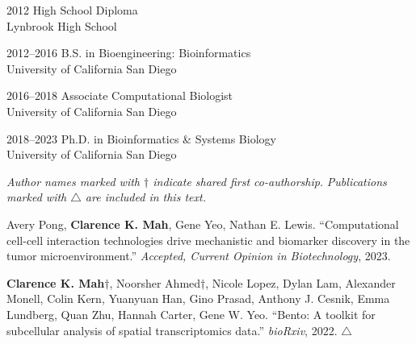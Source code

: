 \documentclass[11pt]{formatting-template}
\begin{document}
\begin{vita}
\noindent
\begin{cv}{}
\begin{cvlist}{}
	\item[2012] High School Diploma\\
		Lynbrook High School
	\item[2012--2016] B.S. in Bioengineering: Bioinformatics\\
		University of California San Diego
	\item[2016--2018] Associate Computational Biologist\\
		University of California San Diego
	\item[2018--2023] Ph.D. in Bioinformatics \& Systems Biology\\
		University of California San Diego
\end{cvlist}
\end{cv}

\publications{}

\noindent \textit{Author names marked with $\dagger$ indicate shared first co-authorship.} \newline
\noindent \textit{Publications marked with $\triangle$ are included in this text.} \newline

\noindent Avery Pong, \textbf{Clarence K. Mah}, Gene Yeo, Nathan E. Lewis. ``Computational cell-cell interaction technologies drive mechanistic and biomarker discovery in the tumor microenvironment.'' \textit{Accepted, Current Opinion in Biotechnology}, 2023. \newline 

\noindent \textbf{Clarence K. Mah}$\dagger$, Noorsher Ahmed$\dagger$, Nicole Lopez, Dylan Lam, Alexander Monell, Colin Kern, Yuanyuan Han, Gino Prasad, Anthony J. Cesnik, Emma Lundberg, Quan Zhu, Hannah Carter, Gene W. Yeo. ``Bento: A toolkit for subcellular analysis of spatial transcriptomics data.'' \textit{bioRxiv}, 2022. $\triangle$ \newline


\end{vita}
\end{document}
